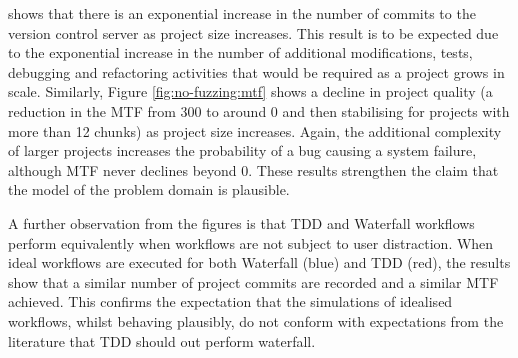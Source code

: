 \documentclass{llncs}
\begin{document}
shows that there is an exponential increase in the number of commits to the version control server as project size
increases.  This result is to be expected due to the exponential increase in the number of additional modifications,
tests, debugging and refactoring activities that would be required as a project grows in scale.  Similarly, Figure
\ref{fig:no-fuzzing:mtf} shows a decline in project quality (a reduction in the MTF from 300 to around 0 and then
stabilising for projects with more than 12 chunks) as project size increases.  Again, the additional complexity of
larger projects increases the probability of a bug causing a system failure, although MTF never declines beyond 0.
These results strengthen the claim that the model of the problem domain is plausible.


A further observation from the figures is that TDD and Waterfall workflows perform equivalently when workflows are not
subject to user distraction.  When ideal workflows are executed for both Waterfall (blue) and TDD (red), the results
show that a similar number of project commits are recorded and a similar MTF achieved.  This confirms the expectation
that the simulations of idealised workflows, whilst behaving plausibly, do not conform with expectations from the
literature that TDD should out perform waterfall.
\end{document}
